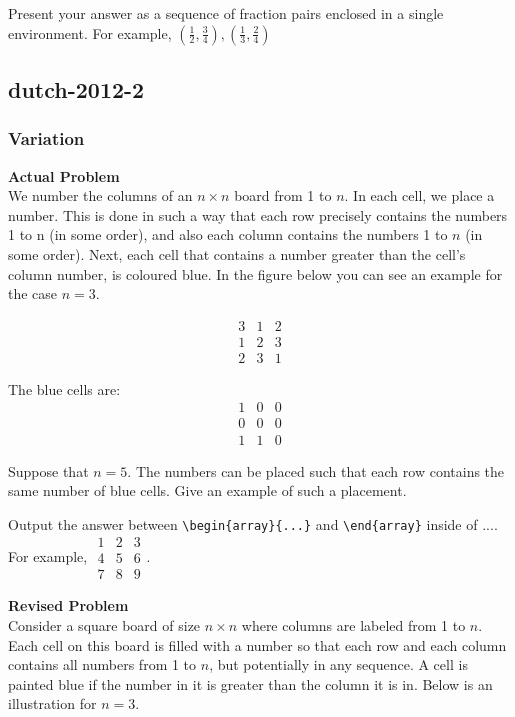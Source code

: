 Present your answer as a sequence of fraction pairs enclosed in a single \(\boxed{}\) environment. For example, \(\boxed{(\frac{1}{2}, \frac{3}{4}), (\frac{1}{3}, \frac{2}{4})}\)

\subsection{dutch-2012-2}
\subsubsection{Variation}
\textbf{Actual Problem}\\
We number the columns of an $n \times n$ board from 1 to $n$. In each cell, we place a number. This is done in such a way that each row precisely contains the numbers 1 to n (in some order), and also each column contains the numbers 1 to $n$ (in some order). Next, each cell that contains a number greater than the cell’s column number, is coloured blue. In the figure below you can see an example for the case $n = 3$.

$$\begin{array}{ccc}
3 & 1 & 2 \\
1 & 2 & 3 \\
2 & 3 & 1
\end{array}$$

The blue cells are:
$$\begin{array}{ccc}
1 & 0 & 0 \\
0 & 0 & 0 \\
1 & 1 & 0
\end{array}$$

Suppose that $n = 5$. The numbers can be placed such that each row contains the same number of blue cells. Give an example of such a placement.

Output the answer between \verb|\begin{array}{...}| and \verb|\end{array}| inside of $\boxed{...}$. For example, $\boxed{\begin{array}{ccc}1 & 2 & 3 \\ 4 & 5 & 6 \\ 7 & 8 & 9\end{array}}$.

\textbf{Revised Problem}\\
Consider a square board of size $n \times n$ where columns are labeled from 1 to $n$. Each cell on this board is filled with a number so that each row and each column contains all numbers from 1 to $n$, but potentially in any sequence. A cell is painted blue if the number in it is greater than the column it is in. Below is an illustration for $n = 3$.


